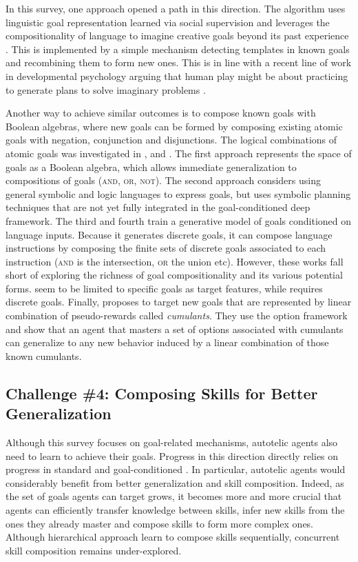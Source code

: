In this survey, one approach opened a path in this direction. The \imagine algorithm uses linguistic goal representation learned via social supervision and leverages the compositionality of language to imagine creative goals beyond its past experience \cite{imagine}. This is implemented by a simple mechanism detecting templates in known goals and recombining them to form new ones. This is in line with a recent line of work in developmental psychology arguing that human play might be about practicing to generate plans to solve imaginary problems  \cite{chu2020exploratory}.

Another way to achieve similar outcomes is to compose known goals with Boolean algebras, where new goals can be formed by composing existing atomic goals with negation, conjunction and disjunctions. The logical combinations of atomic goals was investigated in \cite{tasse2020boolean,chitnis2020glib}, and \cite{colas2020language,akakzia2020decstr}. The first approach represents the space of goals as a Boolean algebra, which allows immediate generalization to compositions of goals (\textsc{and}, \textsc{or}, \textsc{not}). The second approach considers using general symbolic and logic languages to express goals, but uses symbolic planning techniques that are not yet fully integrated in the goal-conditioned deep \rl framework. The third and fourth train a generative model of goals conditioned on language inputs. Because it generates discrete goals, it can compose language instructions by composing the finite sets of discrete goals associated to each instruction (\textsc{and} is the intersection, \textsc{or} the union etc). However, these works fall short of exploring the richness of goal compositionality and its various potential forms. \cite{tasse2020boolean} seem to be limited to specific goals as target features, while \cite{akakzia2020decstr} requires discrete goals. Finally, \cite{barreto_option_2019} proposes to target new goals that are represented by linear combination of pseudo-rewards called \textit{cumulants}. They use the option framework and show that an agent that masters a set of options associated with cumulants can generalize to any new behavior induced by a linear combination of those known cumulants. 

\subsection{Challenge \#4: Composing Skills for Better Generalization}

Although this survey focuses on goal-related mechanisms, autotelic agents also need to learn to achieve their goals. Progress in this direction directly relies on progress in standard \rl and goal-conditioned \rl. In particular, autotelic agents would considerably benefit from better generalization and skill composition. Indeed, as the set of goals agents can target grows, it becomes more and more crucial that agents can efficiently transfer knowledge between skills, infer new skills from the ones they already master and compose skills to form more complex ones. Although hierarchical \rl approach learn to compose skills sequentially, concurrent skill composition remains under-explored.


